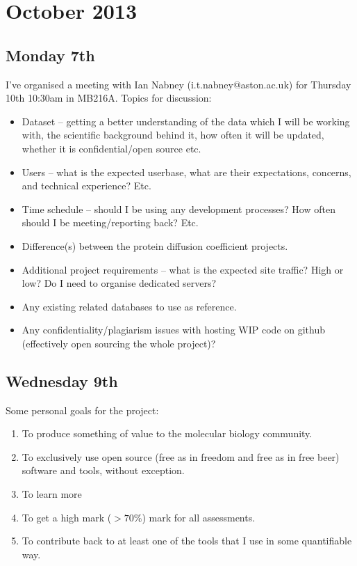 \section{October 2013 \hrulefill}

\subsection{Monday 7th}
I’ve organised a meeting with Ian Nabney (i.t.nabney@aston.ac.uk) for Thursday
10th 10:30am in MB216A. Topics for discussion:

\begin{itemize}
\item Dataset – getting a better understanding of the data which I will be
  working with, the scientific background behind it, how often it will be
  updated, whether it is confidential/open source etc.
\item Users – what is the expected userbase, what are their expectations,
  concerns, and technical experience? Etc.
\item Time schedule – should I be using any development processes? How often
  should I be meeting/reporting back? Etc.
\item Difference(s) between the protein diffusion coefficient projects.
\item Additional project requirements – what is the expected site traffic? High
  or low? Do I need to organise dedicated servers?
\item Any existing related databases to use as reference.
\item Any confidentiality/plagiarism issues with hosting WIP code on github
  (effectively open sourcing the whole project)?
\end{itemize}

\subsection{Wednesday 9th}
Some personal goals for the project:

\begin{enumerate}
\item To produce something of value to the molecular biology community.
\item To exclusively use open source (free as in freedom and free as in free
  beer) software and tools, without exception.
\item To learn more
\item To get a high mark ($> 70\%$) mark for all assessments.
\item To contribute back to at least one of the tools that I use in some
  quantifiable way.
\end{enumerate}

